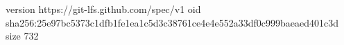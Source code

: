 version https://git-lfs.github.com/spec/v1
oid sha256:25e97bc5373c1dfb1fe1ea1c5d3c38761ce4e4e552a33df0c999baeaed401c3d
size 732
